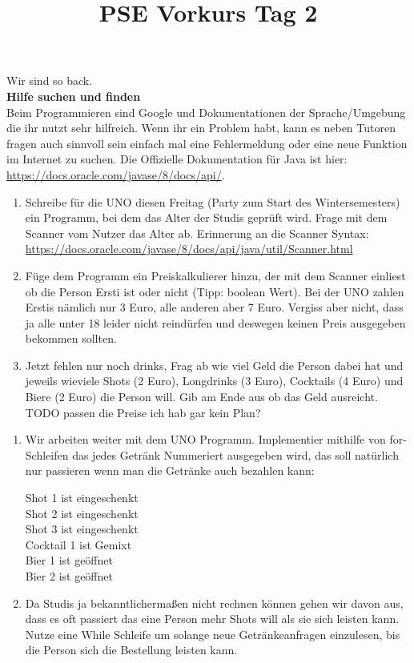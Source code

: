 \documentclass{../../sheet}
\title{PSE Vorkurs Tag 2}
\begin{document}
\maketitle

Wir sind so back.\\

\textbf{Hilfe suchen und finden}\\
Beim Programmieren sind Google und Dokumentationen der Sprache/Umgebung die ihr nutzt sehr hilfreich. Wenn ihr ein Problem habt, kann es neben Tutoren fragen auch sinnvoll sein einfach mal eine Fehlermeldung oder eine neue Funktion im Internet zu suchen. Die Offizielle Dokumentation für Java ist hier: \url{https://docs.oracle.com/javase/8/docs/api/}. 

\newpage
{}
\begin{enumerate}
    \item Schreibe für die UNO diesen Freitag (Party zum Start des Wintersemesters) ein Programm, bei dem das Alter der Studis geprüft wird. Frage mit dem Scanner vom Nutzer das Alter ab. Erinnerung an die Scanner Syntax:\\ \url{https://docs.oracle.com/javase/8/docs/api/java/util/Scanner.html}
    \item Füge dem Programm ein Preiskalkulierer hinzu, der mit dem Scanner einliest ob die Person Ersti ist oder nicht (Tipp: boolean Wert). Bei der UNO zahlen Erstis nämlich nur 3 Euro, alle anderen aber 7 Euro. Vergiss aber nicht, dass ja alle unter 18 leider nicht reindürfen und deswegen keinen Preis ausgegeben bekommen sollten.
    \item Jetzt fehlen nur noch drinks, Frag ab wie viel Geld die Person dabei hat und jeweils wieviele Shots (2 Euro), Longdrinks (3 Euro), Cocktails (4 Euro) und Biere (2 Euro) die Person will. Gib am Ende aus ob das Geld ausreicht. 
    TODO passen die Preise ich hab gar kein Plan?
\end{enumerate}

\newpage
{}
\begin{enumerate}
    \item Wir arbeiten weiter mit dem UNO Programm. Implementier mithilfe von for-Schleifen das jedes Getränk Nummeriert ausgegeben wird, das soll natürlich nur passieren wenn man die Getränke auch bezahlen kann: 
    \begin{ausgabe}
Shot 1 ist  eingeschenkt\\
Shot 2 ist  eingeschenkt\\
Shot 3 ist  eingeschenkt\\
Cocktail 1 ist  Gemixt\\
Bier 1 ist geöffnet\\
Bier 2 ist geöffnet
    \end{ausgabe}
    \item Da Studis ja bekanntlichermaßen nicht rechnen können gehen wir davon aus, dass es oft passiert das eine Person mehr Shots will als sie sich leisten kann. Nutze eine While Schleife um solange neue Getränkeanfragen einzulesen, bis die Person sich die Bestellung leisten kann. 
\end{enumerate}
\end{document}
